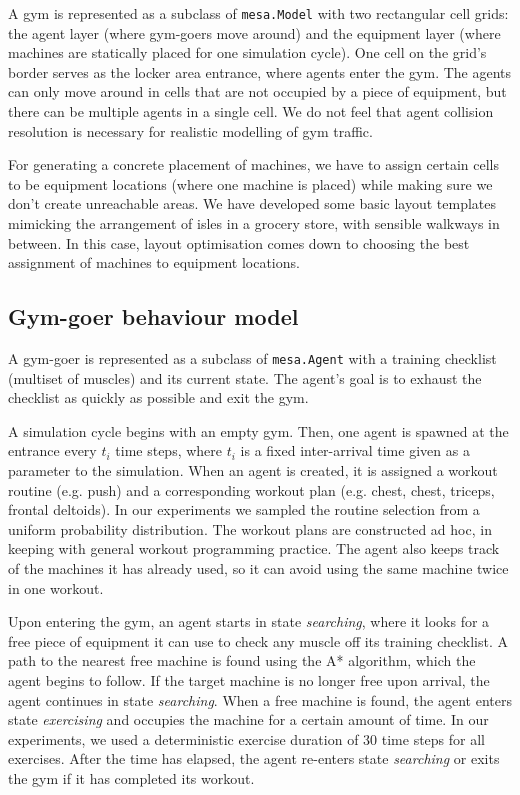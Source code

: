 \documentclass[9pt]{pnas-new}
\begin{document}
A gym is represented as a subclass of \texttt{mesa.Model} with two rectangular cell grids: the agent layer (where gym-goers move around) and the equipment layer (where machines are statically placed for one simulation cycle).
One cell on the grid's border serves as the locker area entrance, where agents enter the gym.
The agents can only move around in cells that are not occupied by a piece of equipment, but there can be multiple agents in a single cell. We do not feel that agent collision resolution is necessary for realistic modelling of gym traffic. 

For generating a concrete placement of machines, we have to assign certain cells to be equipment locations (where one machine is placed) while making sure we don't create unreachable areas. We have developed some basic layout templates mimicking the arrangement of isles in a grocery store, with sensible walkways in between. In this case, layout optimisation comes down to choosing the best assignment of machines to equipment locations.

\subsection*{Gym-goer behaviour model}

A gym-goer is represented as a subclass of \texttt{mesa.Agent} with a training checklist (multiset of muscles) and its current state.
The agent's goal is to exhaust the checklist as quickly as possible and exit the gym.

A simulation cycle begins with an empty gym. Then, one agent is spawned at the entrance every $t_i$ time steps,
where $t_i$ is a fixed inter-arrival time given as a parameter to the simulation.
When an agent is created, it is assigned a workout routine (e.g. push) and a corresponding workout plan (e.g. chest, chest, triceps, frontal deltoids).
In our experiments we sampled the routine selection from a uniform probability distribution.
The workout plans are constructed ad hoc, in keeping with general workout programming practice.
The agent also keeps track of the machines it has already used, so it can avoid using the same machine twice in one workout.

Upon entering the gym, an agent starts in state {\it searching}, where it looks for a free piece of equipment it can use to check any muscle off its training checklist. A path to the nearest free machine is found using the A* algorithm, which the agent begins to follow.
If the target machine is no longer free upon arrival, the agent continues in state {\it searching}.
When a free machine is found, the agent enters state {\it exercising} and occupies the machine for a certain amount of time. In our experiments, we used a deterministic exercise duration of 30 time steps for all exercises.
After the time has elapsed, the agent re-enters state {\it searching} or exits the gym if it has completed its workout.
\end{document}
